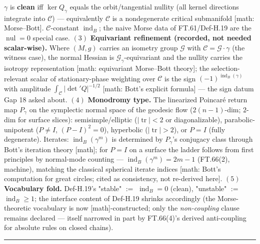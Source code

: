 \begin{definition}
$\gamma$ is \textbf{clean} iff $\ker Q_\gamma$ equals the orbit/tangential nullity (all kernel directions integrate into $\mathcal C$) — equivalently $\mathcal C$ is a nondegenerate critical submanifold [math: Morse–Bott]. $\mathcal C$-constant $\operatorname{ind}_B$; the naive Morse data of FT.61/Def-H.19 are the $\operatorname{nul}=0$ special case. $(3)$ \textbf{Equivariant refinement (recorded, not needed scalar-wise).} Where $(M,g)$ carries an isometry group $\mathcal G$ with $\mathcal C=\mathcal G\cdot\gamma$ (the witness case), the normal Hessian is $\mathcal G_\gamma$-equivariant and the nullity carries the isotropy representation [math: equivariant Morse–Bott theory]; the selection-relevant scalar of stationary-phase weighting over $\mathcal C$ is the sign $(-1)^{\operatorname{ind}_B(\gamma)}$ with amplitude $\int_{\mathcal C}|\det{}'Q|^{-1/2}$ [math: Bott's explicit formula] — the sign datum Gap 18 asked about. $(4)$ \textbf{Monodromy type.} The linearized Poincaré return map $P_\gamma$ on the symplectic normal space of the geodesic flow ($2(n{-}1)$-dim; $2$-dim for surface slices): semisimple/elliptic ($|\operatorname{tr}|<2$ or diagonalizable), parabolic-unipotent ($P\ne I$, $(P-I)^2=0$), hyperbolic ($|\operatorname{tr}|>2$), or $P=I$ (fully degenerate). Iterates: $\operatorname{ind}_B(\gamma^m)$ is determined by $P_\gamma$'s conjugacy class through Bott's iteration theory [math]; for $P=I$ on a surface the ladder follows from first principles by normal-mode counting — $\operatorname{ind}_B(\gamma^m)=2m-1$ (FT.66(2), machine), matching the classical spherical iterate indices [math: Bott's computation for great circles; cited as consistency, not re-derived here]. $(5)$ \textbf{Vocabulary fold.} Def-H.19's "stable" $:=$ $\operatorname{ind}_B=0$ (clean), "unstable" $:=$ $\operatorname{ind}_B\ge1$; the interface content of Def-H.19 shrinks accordingly (the Morse-theoretic vocabulary is now [math]-constructed; only the \textit{non-coupling} clause remains declared — itself narrowed in part by FT.66(4)'s derived anti-coupling for absolute rules on closed chains).

\vspace{2pt}\noindent\rule{\textwidth}{0.4pt}\vspace{2pt}

\end{definition}

